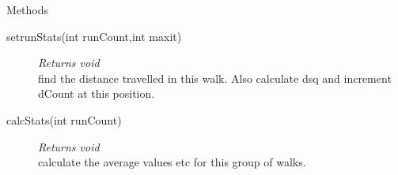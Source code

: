 \documentclass[11pt,a4paper]{article}
\newenvironment{di}
{\begin{flushright}
\begin{minipage}{0.95\textwidth}
\begin{description}
}
{\end{description}
\end{minipage}
\end{flushright}
}
\begin{document}
\colorbox{descriptbg}{\parbox{1.0\textwidth}{\Large{Methods}}}
\begin{di}
\item[{setrunStats(int runCount,int maxit)}]\emph{Returns void}\\
find the distance travelled in this walk. Also calculate dsq and increment dCount at this position.\\
\item[{calcStats(int runCount)}]\emph{Returns void}\\
calculate the average values etc for this group of walks.\\
\end{di}
\end{document}
